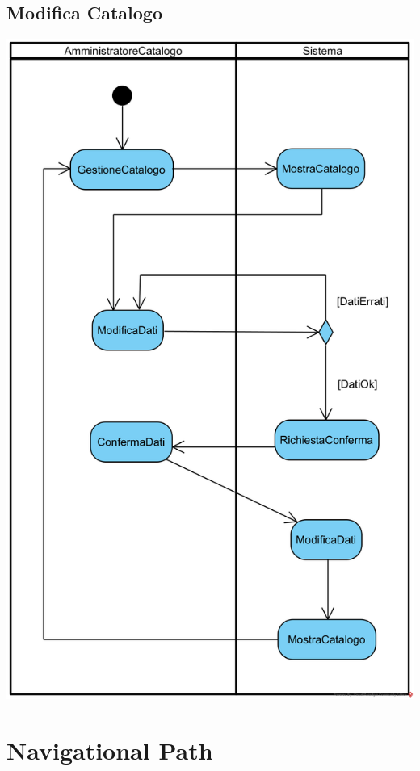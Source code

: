 \documentclass[12pt,a4paper]{article}
\begin{document}
\subsection{Modifica Catalogo}
\begin{center}
\includegraphics[width=\textwidth]{ActivityDiagram/AmministratoreCatalogoModificaArticoloCatalogo}
\end{center}

\newpage
\section{Navigational Path}
\end{document}
